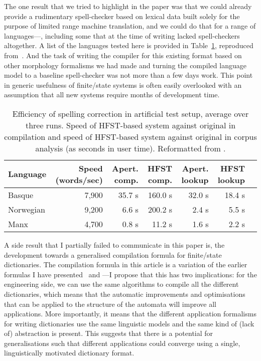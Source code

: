 \documentclass[officiallayout]{unihelcompling}
\begin{document}
The one result that we tried to highlight in the paper was that we could
already provide a rudimentary spell-checker based on lexical data built solely
for the purpose of limited range machine translation, and we could do that for
a range of languages---, including some that at the time
of writing lacked spell-checkers altogether. A list of the languages tested
here is provided in Table~\ref{table:lrec-2012-repro}, reproduced
from~. And the task of writing the compiler
for this existing format based on other morphology formalisms we had made and
turning the compiled language model to a baseline spell-checker was not more
than a few days work. This point in generic usefulness of finite\-/state
systems is often easily overlooked with an assumption that all new systems
require months of development time.

\begin{table}
    \centering
    \begin{small}
\begin{tabular}{|l|r|r||r|r||r|r|}
\hline
\bf Language & \bf Speed (words/sec) & \bf Apert. comp. & \bf HFST comp. & \bf Apert. lookup & \bf HFST lookup \\
\hline
Basque       &  7,900  & 35.7 s & 160.0  s & 32.0 s & 18.4 s \\
Norwegian    &  9,200  & 6.6 s  & 200.2 s  & 2.4 s  & 5.5  s \\
Manx         &  4,700  & 0.8 s  & 11.2  s  & 1.6 s  & 2.2  s \\
\hline
\end{tabular}
\end{small}
  \caption{Efficiency of spelling correction in artificial test setup, average 
  over three runs. Speed of HFST-based system against original in compilation
  and speed of HFST-based system against original in corpus analysis (as
  seconds in user time).  Reformatted from .
  \label{table:lrec-2012-repro}}
\end{table}

A side result that I partially failed to communicate in this paper is, the
development towards a generalised compilation formula for finite\-/state
dictionaries. The compilation formula in this article is a variation of the
earlier formulas I have presented~\citep{linden2009hfst} and
---I propose that this has two implications:
for the engineering side, we can use the same algorithms to compile all the
different dictionaries, which means that the automatic improvements and
optimisations that can be applied to the structure of the automata will improve
all applications. More importantly, it means that the different application
formalisms for writing dictionaries use the same linguistic models and the same
kind of (lack of) abstraction is present. This suggests that there is a
potential for generalisations such that different applications could converge
using a single, linguistically motivated dictionary format.
\end{document}

